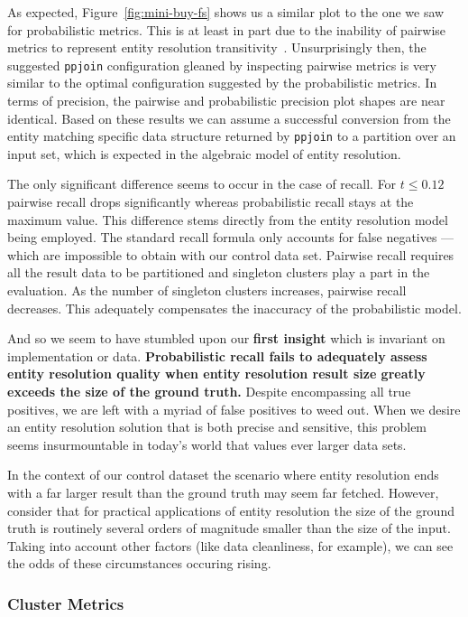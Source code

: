 As expected, Figure~\ref{fig:mini-buy-fs} shows us a similar plot to the one we
saw for probabilistic metrics.
This is at least in part due to the inability of pairwise metrics to represent
entity resolution transitivity~\cite{Men10,hitesh2012}.
Unsurprisingly then, the suggested \texttt{ppjoin} configuration gleaned by
inspecting pairwise metrics is very similar to the optimal configuration
suggested by the probabilistic metrics.
In terms of precision, the pairwise and probabilistic precision plot shapes are
near identical.
Based on these results we can assume a successful conversion from the entity
matching specific data structure returned by \texttt{ppjoin} to a partition over
an input set, which is expected in the algebraic model of entity resolution.

The only significant difference seems to occur in the case of recall.
For $t \le 0.12$ pairwise recall drops significantly whereas probabilistic
recall stays at the maximum value.
This difference stems directly from the entity resolution model being employed.
The standard recall formula only accounts for false negatives --- which are
impossible to obtain with our control data set. 
Pairwise recall requires all the result data to be partitioned and singleton
clusters play a part in the evaluation.
As the number of singleton clusters increases, pairwise recall decreases.
This adequately compensates the inaccuracy of the probabilistic model.

And so we seem to have stumbled upon our \textbf{first insight} which is
invariant on implementation or data.
\textbf{
    Probabilistic recall fails to adequately assess entity resolution quality
    when entity resolution result size greatly exceeds the size of the ground
    truth.
}
Despite encompassing all true positives, we are left with a myriad of false
positives to weed out.
When we desire an entity resolution solution that is both precise and sensitive,
this problem seems insurmountable in today's world that values ever larger data
sets.

In the context of our control dataset the scenario where entity resolution ends
with a far larger result than the ground truth may seem far fetched.
However, consider that for practical applications of entity resolution the size
of the ground truth is routinely several orders of magnitude smaller than the
size of the input.
Taking into account other factors (like data cleanliness, for example), we can
see the odds of these circumstances occuring rising.

\subsubsection{Cluster Metrics}\label{subsubsec:Cluster Results}

